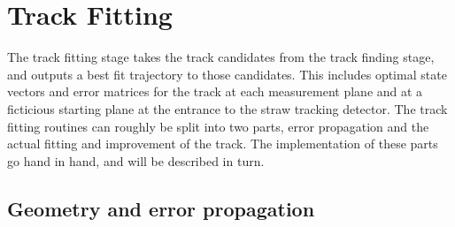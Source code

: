 






\section{Track Fitting}
\label{sec:TrackFitting}




The track fitting stage takes the track candidates from the track finding stage, and outputs a best fit trajectory to those candidates. This includes optimal state vectors and error matrices for the track at each measurement plane and at a ficticious starting plane at the entrance to the straw tracking detector. The track fitting routines can roughly be split into two parts, error propagation and the actual fitting and improvement of the track. The implementation of these parts go hand in hand, and will be described in turn.


\subsection{Geometry and error propagation}

